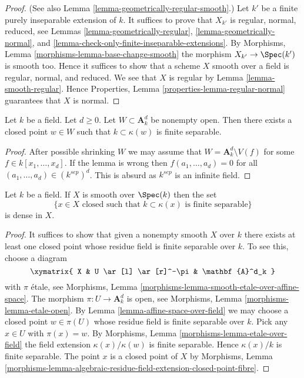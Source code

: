 \begin{proof}
(See also
Lemma \ref{lemma-geometrically-regular-smooth}.)
Let $k'$ be a finite purely inseparable extension of $k$.
It suffices to prove that $X_{k'}$ is regular, normal, reduced, see
Lemmas \ref{lemma-geometrically-regular},
\ref{lemma-geometrically-normal}, and
\ref{lemma-check-only-finite-inseparable-extensions}.
By
Morphisms, Lemma \ref{morphisms-lemma-base-change-smooth}
the morphism $X_{k'} \to \Spec(k')$ is smooth too.
Hence it suffices to show that a scheme $X$ smooth over a field is regular,
normal, and reduced. We see that $X$ is regular by
Lemma \ref{lemma-smooth-regular}.
Hence
Properties, Lemma \ref{properties-lemma-regular-normal}
guarantees that $X$ is normal.
\end{proof}

\begin{lemma}
\label{lemma-affine-space-over-field}
Let $k$ be a field. Let $d \geq 0$. Let $W \subset \mathbf{A}^d_k$
be nonempty open. Then there exists a closed point $w \in W$ such that
$k \subset \kappa(w)$ is finite separable.
\end{lemma}

\begin{proof}
After possible shrinking $W$ we may assume that
$W = \mathbf{A}^d_k \setminus V(f)$ for some $f \in k[x_1, \ldots, x_d]$.
If the lemma is wrong then $f(a_1, \ldots, a_d) = 0$ for all
$(a_1, \ldots, a_d) \in (k^{sep})^d$. This is absurd as $k^{sep}$
is an infinite field.
\end{proof}

\begin{lemma}
\label{lemma-smooth-separable-closed-points-dense}
Let $k$ be a field. If $X$ is smooth over $\Spec(k)$ then
the set
$$
\{x \in X\text{ closed such that }k \subset \kappa(x)
\text{ is finite separable}\}
$$
is dense in $X$.
\end{lemma}

\begin{proof}
It suffices to show that given a nonempty smooth $X$ over $k$
there exists at least one closed point whose residue field is
finite separable over $k$. To see this, choose a diagram
$$
\xymatrix{
X & U \ar[l] \ar[r]^-\pi & \mathbf{A}^d_k
}
$$
with $\pi$ \'etale, see
Morphisms, Lemma \ref{morphisms-lemma-smooth-etale-over-affine-space}.
The morphism $\pi : U \to \mathbf{A}^d_k$ is open, see
Morphisms, Lemma \ref{morphisms-lemma-etale-open}.
By
Lemma \ref{lemma-affine-space-over-field}
we may choose a closed point $w \in \pi(U)$ whose residue field is
finite separable over $k$. Pick any $x \in U$ with $\pi(x) = w$. By
Morphisms, Lemma \ref{morphisms-lemma-etale-over-field}
the field extension $\kappa(x)/\kappa(w)$ is finite separable.
Hence $\kappa(x)/k$ is finite separable. The point $x$ is a
closed point of $X$ by
Morphisms, Lemma
\ref{morphisms-lemma-algebraic-residue-field-extension-closed-point-fibre}.
\end{proof}

